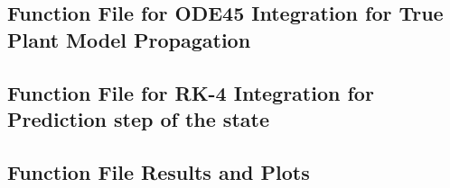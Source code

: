 \documentclass[a4paper]{article}
\begin{document}
\subsection{Function File for ODE45 Integration for True Plant Model Propagation}

\subsection{Function File for RK-4 Integration for Prediction step of the state}

\subsection{Function File Results and Plots}

\end{document}
